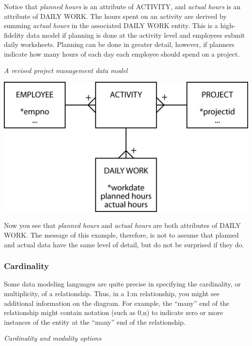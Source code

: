 \documentclass[
]{article}
\begin{document}
Notice that \emph{planned hours} is an attribute of ACTIVITY, and \emph{actual
hours} is an attribute of DAILY WORK. The hours spent on an activity are
derived by summing \emph{actual hours} in the associated DAILY WORK entity.
This is a high-fidelity data model if planning is done at the activity
level and employees submit daily worksheets. Planning can be done in
greater detail, however, if planners indicate how many hours of each day
each employee should spend on a project.

\emph{A revised project management data model}

\includegraphics{Figures/Chapter 7/planning revised.png}

Now you see that \emph{planned hours} and \emph{actual hours} are both attributes
of DAILY WORK. The message of this example, therefore, is not to assume
that planned and actual data have the same level of detail, but do not
be surprised if they do.

\hypertarget{cardinality}{%
\subsubsection*{Cardinality}\label{cardinality}}

Some data modeling languages are quite precise in specifying the
cardinality, or multiplicity, of a relationship. Thus, in a 1:m
relationship, you might see additional information on the diagram. For
example, the ``many'' end of the relationship might contain notation (such
as 0,n) to indicate zero or more instances of the entity at the ``many''
end of the relationship.

\emph{Cardinality and modality options}
\end{document}

